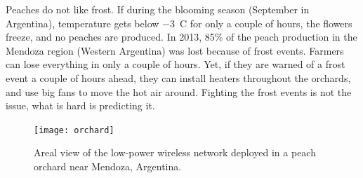 \documentclass{elsarticle}
\begin{document}

Peaches do not like frost.
If during the blooming season (September in Argentina), temperature gets below $-$3~C for only a couple of hours, the flowers freeze, and no peaches are produced.
In 2013, 85\% of the peach production in the Mendoza region (Western Argentina) was lost because of frost events.
Farmers can lose everything in only a couple of hours.
Yet, if they are warned of a frost event a couple of hours ahead, they can install heaters throughout the orchards, and use big fans to move the hot air around.
Fighting the frost events is not the issue, what is hard is predicting it.

\begin{figure}
    \centering
    \texttt{[image: orchard]}
    \caption{Areal view of the low-power wireless network deployed in a peach orchard near Mendoza, Argentina.}
    \label{fig:orchard}
\end{figure}
\end{document}

